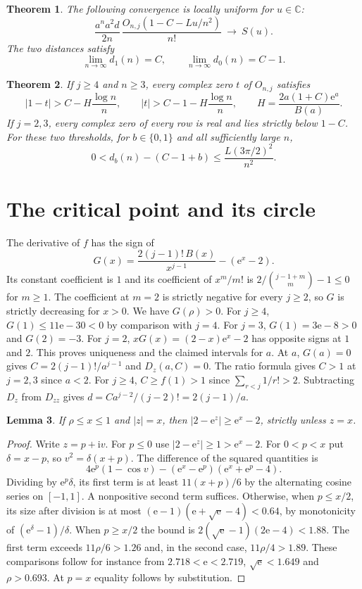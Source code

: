 \documentclass[11pt]{article}
\newtheorem{theorem}{Theorem}
\newtheorem{lemma}[theorem]{Lemma}
\newcommand{\C}{\mathbb C}
\newcommand{\ee}{\mathrm e}
\newcommand{\ii}{\mathrm i}
\begin{document}
\begin{theorem}\label{thm}
The following convergence is locally uniform for $u\in\C$:
\[
 \frac{a^n a^2d}{2n}\,\frac{O_{n,j}(1-C-Lu/n^2)}{n!}
 \ \longrightarrow\ S(u).
\]
The two distances satisfy
\[
 \lim_{n\to\infty}d_1(n)=C,\qquad \lim_{n\to\infty}d_0(n)=C-1 .
\]
\end{theorem}

\begin{theorem}\label{thm:finite}
If $j\ge4$ and $n\ge3$, every complex zero $t$ of $O_{n,j}$ satisfies
\[
 |1-t|>C-H\frac{\log n}{n},\qquad
 |t|>C-1-H\frac{\log n}{n},\qquad H=\frac{2a(1+C)\ee^a}{B(a)} .
\]
If $j=2,3$, every complex zero of every row is real and lies strictly below $1-C$.
For these two thresholds, for $b\in\{0,1\}$ and all sufficiently large $n$,
\[
 0<d_b(n)-(C-1+b)\le \frac{L(3\pi/2)^2}{n^2}.
\]
\end{theorem}

\section{The critical point and its circle}
The derivative of $f$ has the sign of
\[
 G(x)=\frac{2(j-1)!\,B(x)}{x^{j-1}}-(\ee^x-2).
\]
Its constant coefficient is $1$ and its coefficient of $x^m/m!$ is $2/\binom{j-1+m}{m}-1\le0$ for $m\ge1$. The coefficient at $m=2$ is strictly negative for every $j\ge2$, so $G$ is strictly decreasing for $x>0$. We have $G(\rho)>0$. For $j\ge4$, $G(1)\le11\ee-30<0$ by comparison with $j=4$. For $j=3$, $G(1)=3\ee-8>0$ and $G(2)=-3$. For $j=2$, $xG(x)=(2-x)\ee^x-2$ has opposite signs at $1$ and $2$. This proves uniqueness and the claimed intervals for $a$. At $a$, $G(a)=0$ gives $C=2(j-1)!/a^{j-1}$ and $D_z(a,C)=0$. The ratio formula gives $C>1$ at $j=2,3$ since $a<2$. For $j\ge4$, $C\ge f(1)>1$ since $\sum_{r<j}1/r!>2$. Subtracting $D_z$ from $D_{zz}$ gives $d=C a^{j-2}/(j-2)!=2(j-1)/a$.

\begin{lemma}\label{circle}
If $\rho\le x\le1$ and $|z|=x$, then $|2-\ee^z|\ge\ee^x-2$, strictly unless $z=x$.
\end{lemma}
\begin{proof}
Write $z=p+\ii v$. For $p\le0$ use $|2-\ee^z|\ge1>\ee^x-2$. For $0<p<x$ put $\delta=x-p$, so $v^2=\delta(x+p)$. The difference of the squared quantities is
\[
 4\ee^p(1-\cos v)-(\ee^x-\ee^p)(\ee^x+\ee^p-4).
\]
Dividing by $\ee^p\delta$, its first term is at least $11(x+p)/6$ by the alternating cosine series on $[-1,1]$. A nonpositive second term suffices. Otherwise, when $p\le x/2$, its size after division is at most $(\ee-1)(\ee+\sqrt{\ee}-4)<0.64$, by monotonicity of $(\ee^\delta-1)/\delta$. When $p\ge x/2$ the bound is $2(\sqrt{\ee}-1)(2\ee-4)<1.88$. The first term exceeds $11\rho/6>1.26$ and, in the second case, $11\rho/4>1.89$. These comparisons follow for instance from $2.718<\ee<2.719$, $\sqrt{\ee}<1.649$ and $\rho>0.693$. At $p=x$ equality follows by substitution.
\end{proof}
\end{document}
